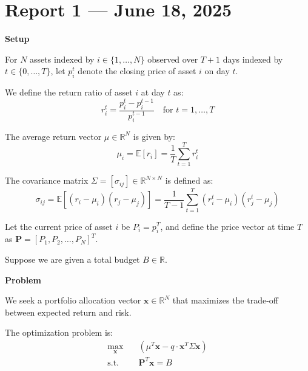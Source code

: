 \section*{Report 1 — June 18, 2025}

{\Huge\bfseries \hspace{2em}Setup\par}
{}
\vspace{0.5em}

For \( N \) assets indexed by \( i \in \{1, \dots, N\} \) observed over \( T+1 \) days indexed by \( t \in \{0, \dots, T\} \), let \( p_i^t \) denote the closing price of asset \( i \) on day \( t \).

We define the return ratio of asset \( i \) at day \( t \) as:
\begin{equation}
    r_i^t = \frac{p_i^t - p_i^{t-1}}{p_i^{t-1}} \quad \text{for } t = 1, \dots, T
\end{equation}

The average return vector \( \mu \in \mathbb{R}^N \) is given by:
\begin{equation}
    \mu_i = \mathbb{E}[r_i] = \frac{1}{T} \sum_{t=1}^T r_i^t
\end{equation}

The covariance matrix \( \Sigma = [\sigma_{ij}] \in \mathbb{R}^{N \times N} \) is defined as:
\begin{equation}
    \sigma_{ij} = \mathbb{E}[(r_i - \mu_i)(r_j - \mu_j)] = \frac{1}{T-1} \sum_{t=1}^T (r_i^t - \mu_i)(r_j^t - \mu_j)
\end{equation}

Let the current price of asset \( i \) be \( P_i = p_i^T \), and define the price vector at time \( T \) as \( \mathbf{P} = [P_1, P_2, \dots, P_N]^T \).

Suppose we are given a total budget \( B \in \mathbb{R} \).

{\Huge\bfseries \hspace{2em}Problem\par}
{}
\vspace{0.5em}

We seek a portfolio allocation vector \( \mathbf{x} \in \mathbb{R}^N \) that maximizes the trade-off between expected return and risk.

The optimization problem is:
\begin{equation}
    \begin{aligned}
    \max_{\mathbf{x}} \quad & ( \mu^T \mathbf{x} - q \cdot \mathbf{x}^T \Sigma \mathbf{x} ) \\
    \text{s.t.} \quad & \mathbf{P}^T \mathbf{x} = B
    \end{aligned}
    \label{eq:opt_problem}
\end{equation}

